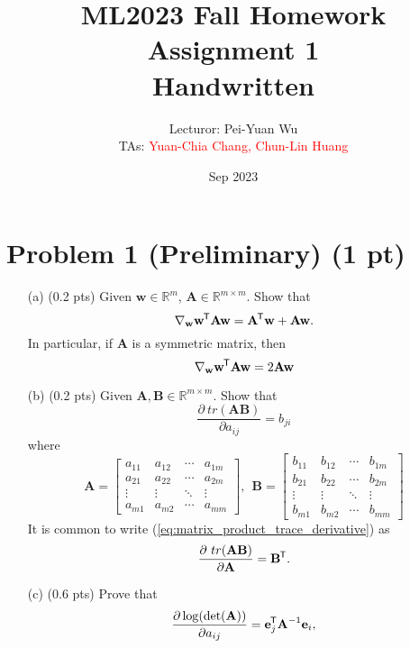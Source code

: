 \documentclass{article}
\title{ML2023 Fall Homework Assignment 1\\ Handwritten}
\author{Lecturor: Pei-Yuan Wu\\
TAs: \textcolor{red}{Yuan-Chia Chang, Chun-Lin Huang}}
\date{Sep 2023}
\newcommand{\real}{\mathbb{R}}
\newcommand*{\tran}{^{\mkern-1.5mu\mathsf{T}}}
\def\vece{{\mathbf e}}
\def\vecw{{\mathbf w}}
\def\matA{{\mathbf A}}
\def\matB{{\mathbf B}}
\def\real{{\mathbb {R}}}
\begin{document}
\maketitle



\section*{Problem 1 (Preliminary) (1 pt)}
\begin{enumerate}
    \item[(a)] (0.2 pts) Given $\vecw\in \real^m$,  $\matA\in\mathbb{R}^{m\times m}$. Show that
    $$\nabla_\vecw \vecw\tran \matA\mathbf{w} = \matA\tran \vecw + \matA\vecw.$$
    In particular, if $\matA$ is a symmetric matrix, then
    $$\nabla_\vecw \vecw\tran \matA\mathbf{w} = 2\matA\vecw$$
    \item[(b)] (0.2 pts) Given $\matA, \matB \in \real^{m \times m}$. Show that
    \begin{equation}\label{eq:matrix_product_trace_derivative}
    \frac{\partial\ tr(\matA\matB)}{\partial a_{ij}} = b_{ji}
    \end{equation}
    where
    \begin{equation*}
    \matA=\left[\begin{array}{cccc}
    a_{11} & a_{12} & \cdots & a_{1 m} \\
    a_{21} & a_{22} & \cdots & a_{2 m} \\
    \vdots & \vdots & \ddots & \vdots \\
    a_{m 1} & a_{m 2} & \cdots & a_{m m}
    \end{array}\right], ~~
    \matB=\left[\begin{array}{cccc}
    b_{11} & b_{12} & \cdots & b_{1 m} \\
    b_{21} & b_{22} & \cdots & b_{2 m} \\
    \vdots & \vdots & \ddots & \vdots \\
    b_{m 1} & b_{m 2} & \cdots & b_{m m}
    \end{array}\right]
    \end{equation*}
    It is common to write (\ref{eq:matrix_product_trace_derivative}) as     
    $$\frac{\partial\ tr(\matA\matB)}{\partial \matA} = \matB\tran.$$
    \item[(c)] (0.6 pts) Prove that
    \begin{equation}\label{eq:matrix_det_log_derivative}
    \frac{\partial \log(\det(\boldsymbol{\matA}))}{\partial a_{ij}} =  \vece_j\tran \boldsymbol{\matA}^{-1}\space \vece_i,

\end{equation}
\end{enumerate}
\end{document}
